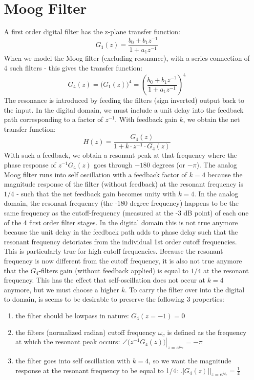 \section{Moog Filter}
A first order digital filter has the z-plane transfer function:
\begin{equation}
 G_1(z) = \frac{b_0 + b_1 z^{-1}}{1 + a_1 z^{-1}}
\end{equation}
When we model the Moog filter (excluding resonance), with a series connection of 4 such filters - this gives the transfer function:
\begin{equation}
 G_4(z) = \big( G_1(z) \big)^4 = \left( \frac{b_0 + b_1 z^{-1}}{1 + a_1 z^{-1}} \right)^4
\end{equation}
The resonance is introduced by feeding the filters (sign inverted) output back to the input. In the digital domain, we must include a unit delay into the feedback path corresponding to a factor of $z^{-1}$. With feedback gain $k$, we obtain the net transfer function:
\begin{equation}
 H(z) = \frac{G_4(z)} {1 + k \cdot z^{-1} \cdot G_4(z)}
\end{equation}
With such a feedback, we obtain a resonant peak at that frequency where the phase response of $z^{-1} G_4(z)$ goes through $-180$ degrees (or $-\pi$). The analog Moog filter runs into self oscillation with a feedback factor of $k=4$ because the magnitude response of the filter (without feedback) at the resonant frequency is $1/4$ - such that the net feedback gain becomes unity with $k=4$. In the analog domain, the resonant frequency (the -180 degree frequency) happens to be the same frequency as the cutoff-frequency (measured at the -3 dB point) of each one of the 4 first order filter stages. In the digital domain this is not true anymore because the unit delay in the feedback path adds to phase delay such that the resonant frequency detoriates from the individual 1st order cutoff frequencies. This is particularly true for high cutoff frequencies. Because the resonant frequency is now different from the cutoff frequency, it is also not true anymore that the $G_4$-filters gain (without feedback applied) is equal to $1/4$ at the resonant frequency. This has the effect that self-oscillation does not occur at $k=4$ anymore, but we must choose a higher $k$. To carry the filter over into the digital to domain, is seems to be desirable to preserve the following 3 properties:
\begin{enumerate}
	\item the filter should be lowpass in nature: $G_4(z=-1) = 0$
	\item the filters (normalized radian) cutoff frequency $\omega_c$ is defined as the frequency at which the resonant peak occurs: $\left. \angle \big( z^{-1} G_4(z) \big) \right|_{z=e^{j \omega_c}} = -\pi$
	\item the filter goes into self oscillation with $k=4$, so we want the magnitude response at the resonant frequency to be equal to 1/4: $\big. |G_4(z)| \big|_{z=e^{j \omega_c}}= \frac{1}{4}$
\end{enumerate}
